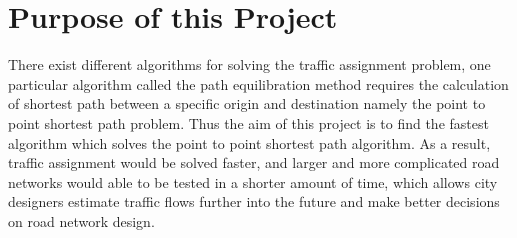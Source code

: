 \begin{comment}
Both of these methods are iterative methods that require shortest path calculations for every trip origins in the network.
It is not difficult to imagine that there would be many shortest path calculations if the network has hundreds of origins and destinations and takes some iterations to solve.
Each shortest path calculation would also be very hard to solve if the network has a few hundred intersections and a few thousand roads for a realistic city road network.
\citet{Sheffi} states that finding the shortest path is the most computation intensive component for the PE or Frank-Wolfe algorithms, 
other components in the algorithms such as updating new values and convergence check only requires a few percentages of the total running time.
Overall, speeding up shortest path calculations would significantly speed up the traffic assignment algorithms.
As a result,
traffic forecasting would be solved faster for larger and more complicated road networks,
which allow city designers predict traffic further into the future and make better decisions on road network design.
\end{comment}

\section{Purpose of this Project}
There exist different algorithms for solving the traffic assignment problem,
one particular algorithm called the path equilibration method requires the calculation of shortest path between a specific origin and destination
namely the point to point shortest path problem.
Thus the aim of this project is to find the fastest algorithm which solves the point to point shortest path algorithm.
As a result, traffic assignment would be solved faster,
and larger and more complicated road networks would able to be tested in a shorter amount of time,
which allows city designers estimate traffic flows further into the future and make better decisions on road network design.

\begin{comment}
The algorithm that are going to be tested are:
\begin{itemize}
    \item Bellman-Ford Label Correcting Algorithm,
    \item Dijkstra Label Setting Algorithm (using different data structures),
    \item Bidirectional Dijkstra,
    \item A* Search,
    \item Bidirectional A* search.
\end{itemize}

This project also aims to find and discuss techniques that can speed shortest path calculations in an iterative environment:
\begin{itemize}
    \item network preprocessing,
    \item using information from the previous iteration for the current iteration to avoid recalculating shortest paths that are not going to change.
\end{itemize}
\end{comment}


